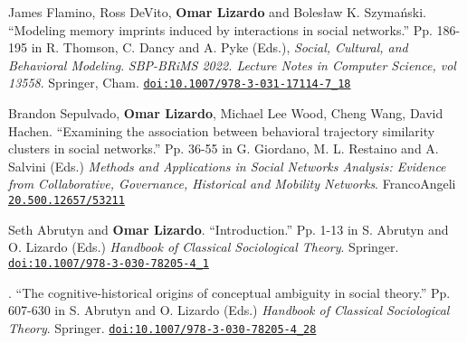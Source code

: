 



\ind James Flamino, Ross DeVito, {\bf Omar Lizardo} and Boles\l{}aw K. Szyma\'{n}ski. ``Modeling memory imprints induced by interactions in social networks.'' Pp. 186-195 in R. Thomson, C. Dancy and A. Pyke (Eds.), {\em Social, Cultural, and Behavioral Modeling}. {\em SBP-BRiMS 2022. Lecture Notes in Computer Science, vol 13558}. Springer, Cham. \href{https://doi.org/10.1007/978-3-031-17114-7_18}{\nolinkurl{doi:10.1007/978-3-031-17114-7_18}}

\ind Brandon Sepulvado, {\bf Omar Lizardo}, Michael Lee Wood, Cheng Wang, David Hachen. ``Examining the association between behavioral trajectory similarity clusters in social networks.'' Pp. 36-55 in G. Giordano, M. L. Restaino and A. Salvini (Eds.)  {\em Methods and Applications in Social Networks Analysis: Evidence from Collaborative, Governance, Historical and Mobility Networks}. FrancoAngeli \href{https://library.oapen.org/handle/20.500.12657/53211}{\nolinkurl{20.500.12657/53211}}

\ind Seth Abrutyn and {\bf Omar Lizardo}. ``Introduction.'' Pp. 1-13 in S. Abrutyn and O. Lizardo (Eds.) {\em Handbook of Classical Sociological Theory}. Springer. \href{https://doi.org/10.1007/978-3-030-78205-4_1}{\nolinkurl{doi:10.1007/978-3-030-78205-4_1}}

. ``The cognitive-historical origins of conceptual ambiguity in social theory.'' Pp. 607-630 in S. Abrutyn and O. Lizardo (Eds.) {\em Handbook of Classical Sociological Theory}. Springer. \href{https://doi.org/10.1007/978-3-030-78205-4_28}{\nolinkurl{doi:10.1007/978-3-030-78205-4_28}}

